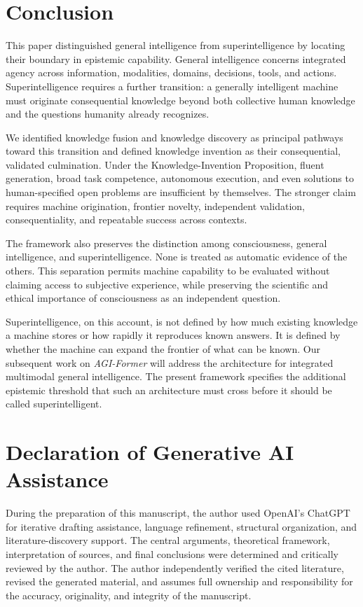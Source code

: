 \section{\textbf{Conclusion}}
\label{sec:conclusion}

This paper distinguished general intelligence from superintelligence by
locating their boundary in epistemic capability. General intelligence concerns
integrated agency across information, modalities, domains, decisions, tools,
and actions. Superintelligence requires a further transition: a generally
intelligent machine must originate consequential knowledge beyond both
collective human knowledge and the questions humanity already recognizes.

We identified knowledge fusion and knowledge discovery as principal pathways
toward this transition and defined knowledge invention as their consequential,
validated culmination. Under the Knowledge-Invention Proposition, fluent
generation, broad task competence, autonomous execution, and even solutions to
human-specified open problems are insufficient by themselves. The stronger
claim requires machine origination, frontier novelty, independent validation,
consequentiality, and repeatable success across contexts.

The framework also preserves the distinction among consciousness, general
intelligence, and superintelligence. None is treated as automatic evidence of
the others. This separation permits machine capability to be evaluated without
claiming access to subjective experience, while preserving the scientific and
ethical importance of consciousness as an independent question.

Superintelligence, on this account, is not defined by how much existing
knowledge a machine stores or how rapidly it reproduces known answers. It is
defined by whether the machine can expand the frontier of what can be known.
Our subsequent work on \emph{AGI-Former} will address the architecture for
integrated multimodal general intelligence. The present framework specifies
the additional epistemic threshold that such an architecture must cross before
it should be called superintelligent.

\section*{Declaration of Generative AI Assistance}
During the preparation of this manuscript, the author used OpenAI's
ChatGPT for iterative drafting assistance, language refinement,
structural organization, and literature-discovery support. The central
arguments, theoretical framework, interpretation of sources, and final
conclusions were determined and critically reviewed by the author. The
author independently verified the cited literature, revised the
generated material, and assumes full ownership and responsibility for the accuracy,
originality, and integrity of the manuscript.